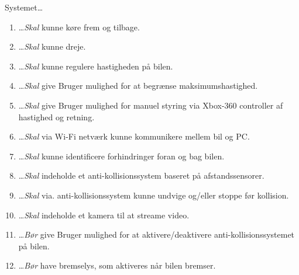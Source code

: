 Systemet\ldots
\begin{enumerate}\itemsep1pt \parskip0pt 
	\item \ldots  \emph{Skal} kunne køre frem og tilbage.
	\item \ldots  \emph{Skal} kunne dreje.
	\item \ldots  \emph{Skal} kunne regulere hastigheden på bilen.
	\item \ldots  \emph{Skal} give Bruger mulighed for at begrænse maksimumshastighed.
	\item \ldots  \emph{Skal} give Bruger mulighed for manuel styring via Xbox-360 controller af hastighed og retning.
	\item \ldots  \emph{Skal} via Wi-Fi netværk kunne kommunikere mellem bil og PC.
	\item \ldots  \emph{Skal} kunne identificere forhindringer foran og bag bilen.
	\item \ldots  \emph{Skal} indeholde et anti-kollisionssystem baseret på afstandssensorer.
	\item \ldots  \emph{Skal} via. anti-kollisionssystem kunne undvige og/eller stoppe før kollision.
	\item \ldots  \emph{Skal} indeholde et kamera til at streame video.
	\item \ldots  \emph{Bør} give Bruger mulighed for at aktivere/deaktivere anti-kollisionssystemet på bilen.
	\item \ldots \emph{Bør} have bremselys, som aktiveres når bilen bremser.
\end{enumerate}


